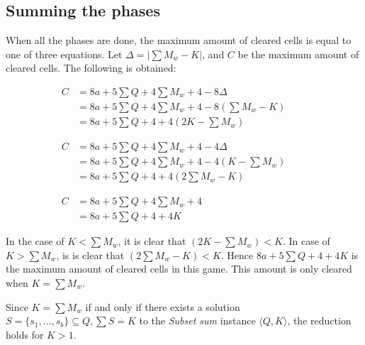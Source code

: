 \subsection{Summing the phases}

When all the phases are done, the maximum amount of cleared cells is equal to one of three equations. Let $\Delta = |\sum M_w - K|$, and $C$ be the maximum amount of cleared cells. The following is obtained:

\begin{equation} \tag{$K < \sum M_w$}
\begin{split}
C & = 8a + 5 \sum Q + 4 \sum M_w + 4 - 8 \Delta  \\
& = 8a + 5 \sum Q + 4 \sum M_w + 4 - 8 \left( \sum M_w - K\right) \phantom{+ 4K} \\
& = 8a + 5 \sum Q + 4 + 4 \left(2K - \sum M_w \right)
\end{split}
\end{equation}

\begin{equation} \tag{$K > \sum M_w$}
\begin{split}
C & = 8a + 5 \sum Q + 4 \sum M_w + 4 - 4 \Delta \\
& = 8a + 5 \sum Q + 4 \sum M_w + 4 - 4 \left( K - \sum M_w \right) \phantom{+ 4K} \\
& = 8a + 5 \sum Q + 4 + 4 \left(2 \sum M_w - K \right)
\end{split}
\end{equation}

\begin{equation} \tag{$K = \sum M_w$}
\begin{split}
C & = 8a + 5 \sum Q + 4 \sum M_w + 4 \phantom{- 8 \Delta} \\
& = 8a + 5 \sum Q + 4 + 4K \phantom{+ 4 \sum M_w - 8 \left(\sum M_w + K \right)}
\end{split}
\end{equation}

In the case of $K < \sum M_w$, it is clear that $\left(2K - \sum M_w \right) < K$. In case of $K > \sum M_w$, is is clear that $\left(2 \sum M_w - K \right) < K$. Hence $8a + 5 \sum Q + 4 + 4K$ is the maximum amount of cleared cells in this game. This amount is only cleared when $K = \sum M_w$.

Since $K = \sum M_w$ if and only if there exists a solution $S = \{s_1, \ldots, s_b \} \subseteq Q, \sum S = K$ to the \textit{Subset sum} instance $\langle Q, K \rangle$, the reduction holds for $K > 1$.
